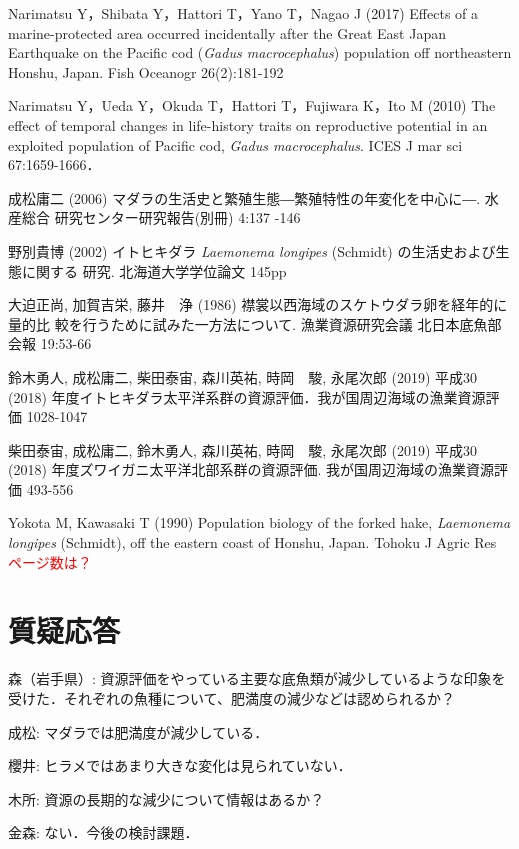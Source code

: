 \documentclass[11pt]{article} %
\begin{document}
\begin{linenumbers}
\hangindent=30pt
\noindent
Narimatsu Y，Shibata Y，Hattori T，Yano T，Nagao J (2017) Effects of a marine-protected area occurred incidentally after the Great East Japan Earthquake on the Pacific cod (\textit{Gadus macrocephalus}) population off northeastern Honshu, Japan. Fish Oceanogr 26(2):181-192

\hangindent=30pt
\noindent
Narimatsu Y，Ueda Y，Okuda T，Hattori T，Fujiwara K，Ito M (2010) The effect of temporal changes in life-history traits on reproductive potential in an exploited population of Pacific cod, \textit{Gadus macrocephalus}. ICES J mar sci 67:1659-1666．

\hangindent=30pt
\noindent
成松庸二 (2006) マダラの生活史と繁殖生態―繁殖特性の年変化を中心に―. 水産総合
研究センター研究報告(別冊) 4:137 -146

\hangindent=30pt
\noindent
野別貴博 (2002) イトヒキダラ \textit{Laemonema longipes} (Schmidt) の生活史および生態に関する
研究. 北海道大学学位論文 145pp

\hangindent=30pt
\noindent
大迫正尚, 加賀吉栄, 藤井　浄 (1986) 襟裳以西海域のスケトウダラ卵を経年的に量的比
較を行うために試みた一方法について. 漁業資源研究会議 北日本底魚部会報 19:53-66

\hangindent=30pt
\noindent
鈴木勇人, 成松庸二, 柴田泰宙, 森川英祐, 時岡　駿, 永尾次郎 (2019) 平成30 (2018) 年度イトヒキダラ太平洋系群の資源評価．我が国周辺海域の漁業資源評価 1028-1047

\hangindent=30pt
\noindent
柴田泰宙, 成松庸二, 鈴木勇人, 森川英祐, 時岡　駿, 永尾次郎 (2019) 平成30 (2018) 
年度ズワイガニ太平洋北部系群の資源評価. 我が国周辺海域の漁業資源評価 493-556

\hangindent=30pt
\noindent
Yokota M, Kawasaki T (1990) Population biology of the forked hake, \textit{Laemonema longipes} 
 (Schmidt), off the eastern coast of Honshu, Japan. Tohoku J Agric Res 
\textcolor{red}{ページ数は？}

\section{質疑応答}
森（岩手県）: 資源評価をやっている主要な底魚類が減少しているような印象を受けた．それぞれの魚種について、肥満度の減少などは認められるか？

成松: マダラでは肥満度が減少している．

櫻井: ヒラメではあまり大きな変化は見られていない．

木所: 資源の長期的な減少について情報はあるか？  

金森: ない．今後の検討課題．


\end{linenumbers}
\end{document}
